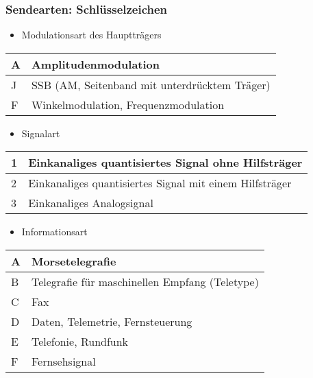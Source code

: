 \begin{frame}
    \frametitle{Sendearten: Schlüsselzeichen}

    \begin{itemize}
        \item Modulationsart des Hauptträgers
    \end{itemize}

    \begin{tabular}{|l|l|}\hline
        A & Amplitudenmodulation \\ \hline
        J & SSB (AM, Seitenband mit unterdrücktem Träger) \\ \hline
        F & Winkelmodulation, Frequenzmodulation \\ \hline
    \end{tabular}

    \begin{itemize}
        \item Signalart
    \end{itemize}
    
    \begin{tabular}{|l|l|}\hline
        1 & Einkanaliges quantisiertes Signal ohne Hilfsträger \\ \hline
        2 & Einkanaliges quantisiertes Signal mit einem Hilfsträger \\ \hline
        3 & Einkanaliges Analogsignal \\ \hline
    \end{tabular}

    \begin{itemize}
        \item Informationsart
    \end{itemize}
 
    \begin{tabular}{|l|l|}\hline
        A & Morsetelegrafie \\ \hline
        B & Telegrafie für maschinellen Empfang (Teletype) \\ \hline
        C & Fax \\ \hline
        D & Daten, Telemetrie, Fernsteuerung \\ \hline
        E & Telefonie, Rundfunk \\ \hline
        F & Fernsehsignal \\ \hline
    \end{tabular}
   
\end{frame}

